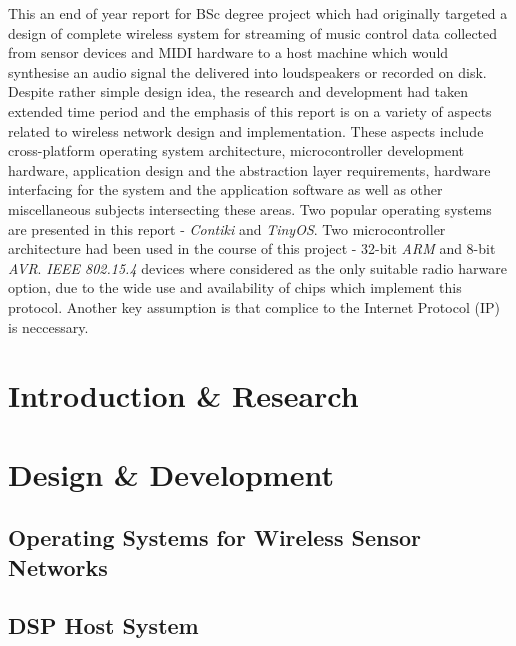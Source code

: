 \maketitle


\abstract
{

   This an end of year report for BSc degree project which had originally targeted
  a design of complete wireless system for streaming of music control data collected
  from sensor devices and MIDI hardware to a host machine which would synthesise an
  audio signal the delivered into loudspeakers or recorded on disk. Despite rather
  simple design idea, the research and development had taken extended time period
  and the emphasis of this report is on a variety of aspects related to wireless
  network design and implementation. These aspects include cross-platform operating
  system architecture, microcontroller development hardware, application design and
  the abstraction layer requirements, hardware interfacing for the system and the
  application software as well as other miscellaneous subjects intersecting these
  areas. Two popular operating systems are presented in this report - \emph{Contiki}
  and \emph{TinyOS}. Two microcontroller architecture had been used in the course
  of this project - 32-bit \emph{ARM} and 8-bit \emph{AVR}. \emph{IEEE 802.15.4}
  devices where considered as the only suitable radio harware option, due to the
  wide use and availability of chips which implement this protocol. Another key
  assumption is that complice to the Internet Protocol (IP) is neccessary.

}

\tableofcontents
\listoffigures


\part{Introduction \& Research}
\part{Design \& Development} 
\chapter{Operating Systems for Wireless Sensor Networks}



\chapter{DSP Host System}









